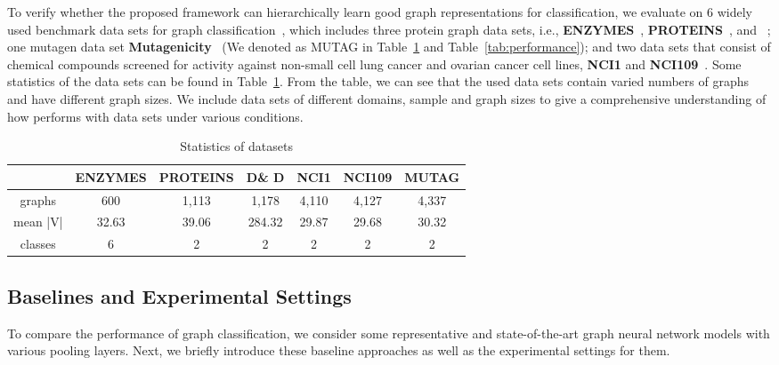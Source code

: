 \documentclass[sigconf]{acmart}
\begin{document}
To verify whether the proposed framework can hierarchically learn good graph representations for classification, we evaluate  on 6 widely used benchmark data sets for graph classification~\cite{KKMMN2016}, which includes three protein graph data sets, i.e., {\bf ENZYMES}~\cite{borgwardt2005protein,schomburg2004brenda}, {\bf PROTEINS}~\cite{borgwardt2005protein,dobson2003distinguishing}, and ~\cite{dobson2003distinguishing,shervashidze2011weisfeiler}; one mutagen data set {\bf Mutagenicity}~\cite{riesen2008iam,kazius2005derivation} (We denoted as MUTAG in Table~\ref{tab:statistics} and Table~\ref{tab:performance}); and two data sets that consist of chemical compounds screened for activity against non-small cell lung cancer and ovarian cancer cell lines, {\bf NCI1} and {\bf NCI109}~\cite{wale2008comparison}. 
Some statistics of the data sets can be found in Table~\ref{tab:statistics}. From the table, we can see that the used data sets contain varied numbers of graphs and have different graph sizes. We include data sets of different domains, sample and graph sizes
to give a comprehensive understanding of how  performs with data sets under various conditions.
{\footnotesize
\begin{table}[h]
	\begin{center}
		\vspace{-0.15in}
		\caption{Statistics of datasets\label{tab:statistics}}
		\vspace*{-0.15in}
		\begin{tabular}{c |c|c |c|c|c|c} 
			\hline
			&ENZYMES & PROTEINS& D\& D & NCI1 & NCI109 & MUTAG \\ 
			\hline
			 graphs &600  & 1,113 & 1,178 & 4,110&4,127& 4,337\\
			\hline
			 mean |V| & 32.63& 39.06 & 284.32 & 29.87 &29.68&30.32\\
			\hline
			 classes & 6 & 2&2 &2 &2& 2\\
			\hline 
		\end{tabular}
			\vspace{-0.15in}
	\end{center}
\end{table}
}
\subsection{Baselines and Experimental Settings}

To compare the performance of graph classification, we consider some representative and state-of-the-art graph neural network models with various pooling layers. Next, we briefly introduce these baseline approaches as well as the experimental settings for them. 
 
\end{document}

